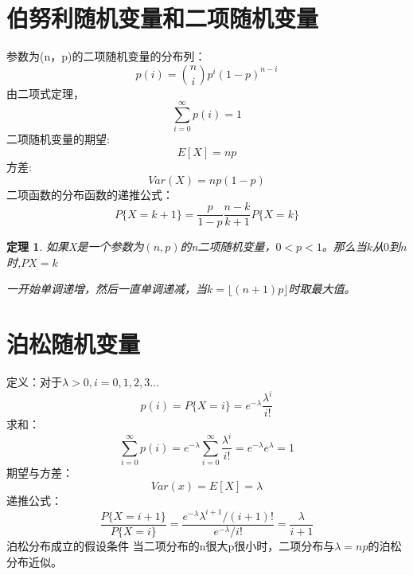 \documentclass[a4paper]{book}
\newtheorem{theorem}{定理}[chapter]
\begin{document}
    \section{伯努利随机变量和二项随机变量}
        参数为(n，p)的二项随机变量的分布列：
        \begin{equation*}
            p(i) = \binom{n}{i}p^i(1-p)^{n-i}
        \end{equation*}
        由二项式定理，
        \begin{equation*}
            \sum^\infty_{i=0}p(i) = 1
        \end{equation*}
        二项随机变量的期望:
        \begin{equation*}
            E[X] = np
        \end{equation*}
        方差:
        \begin{equation*}
            Var(X) = np(1-p)
        \end{equation*}
        二项函数的分布函数的递推公式：
        \begin{equation*}
            P\{X = k + 1\} = \frac{p}{1-p} \frac{n-k}{k+1}P\{X = k\}
        \end{equation*}
        \begin{theorem}
            如果X是一个参数为$(n,p)$的n二项随机变量，$0<p<1$。那么当$k$从$0$到$n$时,$P{X=k}$
            
            一开始单调递增，然后一直单调递减，当$k=\lfloor(n+1)p\rfloor$时取最大值。
        \end{theorem}
    \section{泊松随机变量}
        定义：对于$\lambda > 0,i = 0,1,2,3\dots$
        \begin{equation*}
            p(i) = P\{X = i\} = e^{-\lambda}\frac{\lambda^i}{i!}
        \end{equation*}
        求和：
        \begin{equation*}
            \sum_{i=0}^\infty p(i) = e^{-\lambda} \sum_{i=0}^\infty\frac{\lambda^i}{i!} = e^{-\lambda}e^\lambda = 1
        \end{equation*}
        期望与方差：
        \begin{equation*}
            Var(x) = E[X] = \lambda
        \end{equation*}
        递推公式：
        \begin{equation*}
            \frac{P\{X = i + 1\}}{P\{X = i\}} = \frac{e^{-\lambda}\lambda^{i+1}/(i+1)!}{e^{-\lambda}/i!} = \frac{\lambda}{i+1}
        \end{equation*}
        泊松分布成立的假设条件
        \linebreak
        \linebreak
        当二项分布的n很大p很小时，二项分布与$\lambda = np$的泊松分布近似。
\end{document}
